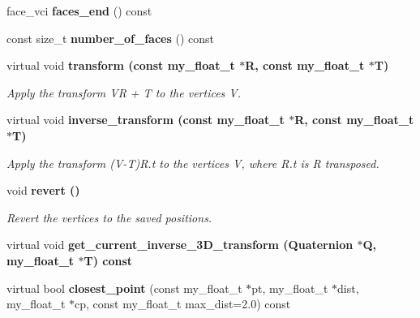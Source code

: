 \begin{CompactItemize}
\item 
face\_\-vci \textbf{faces\_\-end} () const \label{classASCbase_1_1geometry_1_1SimpleTrimeshTwo_3f250221a3eadd745219cc7865475fc9}

\item 
const size\_\-t \textbf{number\_\-of\_\-faces} () const \label{classASCbase_1_1geometry_1_1SimpleTrimeshTwo_8e65a9b44ae0f2edb2814bf382636488}

\item 
virtual void \bf{transform} (const my\_\-float\_\-t $\ast$R, const my\_\-float\_\-t $\ast$T)\label{classASCbase_1_1geometry_1_1SimpleTrimeshTwo_b0eec9fa72b96f2a62c1f116bd93a661}

\begin{CompactList}\small\item\em Apply the transform VR + T to the vertices V. \item\end{CompactList}\item 
virtual void \bf{inverse\_\-transform} (const my\_\-float\_\-t $\ast$R, const my\_\-float\_\-t $\ast$T)\label{classASCbase_1_1geometry_1_1SimpleTrimeshTwo_984f0b676e30e0e507e3cda27316ceea}

\begin{CompactList}\small\item\em Apply the transform (V-T)R.t to the vertices V, where R.t is R transposed. \item\end{CompactList}\item 
void \bf{revert} ()\label{classASCbase_1_1geometry_1_1SimpleTrimeshTwo_925bef71cba895382a4620e52ae4316e}

\begin{CompactList}\small\item\em Revert the vertices to the saved positions. \item\end{CompactList}\item 
virtual void \bf{get\_\-current\_\-inverse\_\-3D\_\-transform} (Quaternion $\ast$Q, my\_\-float\_\-t $\ast$T) const 
\item 
virtual bool \textbf{closest\_\-point} (const my\_\-float\_\-t $\ast$pt, my\_\-float\_\-t $\ast$dist, my\_\-float\_\-t $\ast$cp, const my\_\-float\_\-t max\_\-dist=2.0) const \label{classASCbase_1_1geometry_1_1SimpleTrimeshTwo_518278360584dcb1c13344689a62e3f9}


\end{CompactItemize}
